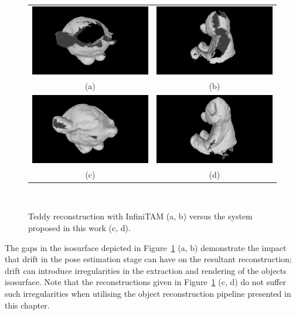 \begin{figure}[!htbp]
	\centering
	\begin{tabular}{cc}
		\includegraphics[width=.4\linewidth]{figures/object_recon/gappy/one_scene00.png}&
    \includegraphics[width=.4\linewidth]{figures/object_recon/gappy/one_scene01.png}\\
    (a) & (b) \\
		\includegraphics[width=.4\linewidth]{figures/object_recon/gappy/multi_scene00.png}&
    \includegraphics[width=.4\linewidth]{figures/object_recon/gappy/multi_scene01.png}\\
    (c) & (d)\\
	\end{tabular}
  \caption[Probabilistic Object Reconstruction Qualitative Results V]
  {
    Teddy reconstruction with InfiniTAM (a, b) versus the system proposed in this 
    work (c, d).
  }
~\label{figure:probobj_gappy_teddy}
\end{figure}

The gaps in the isosurface depicted in Figure~\ref{figure:probobj_gappy_teddy} (a, b) 
demonstrate the impact that drift in the pose estimation stage can have on the resultant 
reconstruction; drift can introduce irregularities in the extraction and rendering of the objects 
isosurface. Note that the reconstructions given in Figure~\ref{figure:probobj_gappy_teddy} 
(c, d) do not suffer such irregularities when utilising the object reconstruction pipeline 
presented in this chapter.


